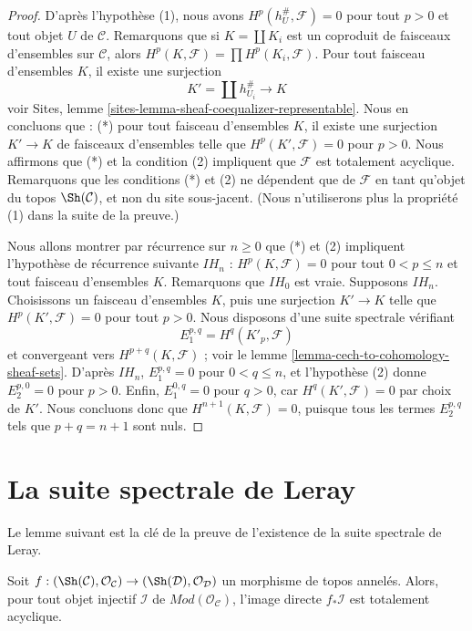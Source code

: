 \begin{proof}
D'après l'hypothèse (1), nous avons
$H^p(h_U^\#, \mathcal{F}) = 0$ pour tout $p > 0$ et tout objet $U$ de
$\mathcal{C}$. Remarquons que si $K = \coprod K_i$ est un coproduit de
faisceaux d'ensembles sur $\mathcal{C}$, alors
$H^p(K, \mathcal{F}) = \prod H^p(K_i, \mathcal{F})$.
Pour tout faisceau d'ensembles $K$, il existe une surjection
$$
K' = \coprod h_{U_i}^\# \longrightarrow K
$$
voir Sites, lemme \ref{sites-lemma-sheaf-coequalizer-representable}.
Nous en concluons que : (*) pour tout faisceau d'ensembles $K$, il existe une
surjection $K' \to K$ de faisceaux d'ensembles telle que
$H^p(K', \mathcal{F}) = 0$ pour $p > 0$. Nous affirmons que (*) et la
condition (2) impliquent que $\mathcal{F}$ est totalement acyclique.
Remarquons que les conditions (*) et (2) ne dépendent que de $\mathcal{F}$ en
tant qu'objet du topos $\Sh(\mathcal{C})$, et non du site sous-jacent.
(Nous n'utiliserons plus la propriété (1) dans la suite de la preuve.)

\medskip\noindent
Nous allons montrer par récurrence sur $n \geq 0$ que (*) et (2) impliquent
l'hypothèse de récurrence suivante $IH_n$ :
$H^p(K, \mathcal{F}) = 0$ pour tout $0 < p \leq n$ et tout faisceau
d'ensembles $K$. Remarquons que $IH_0$ est vraie. Supposons $IH_n$.
Choisissons un faisceau d'ensembles $K$, puis une surjection $K' \to K$ telle
que $H^p(K', \mathcal{F}) = 0$ pour tout $p > 0$. Nous disposons d'une suite
spectrale vérifiant
$$
E_1^{p, q} = H^q(K'_p, \mathcal{F})
$$
et convergeant vers $H^{p + q}(K, \mathcal{F})$ ; voir le
lemme \ref{lemma-cech-to-cohomology-sheaf-sets}.
D'après $IH_n$, $E_1^{p, q} = 0$ pour $0 < q \leq n$, et l'hypothèse (2)
donne $E_2^{p, 0} = 0$ pour $p > 0$. Enfin, $E_1^{0, q} = 0$ pour $q > 0$,
car $H^q(K', \mathcal{F}) = 0$ par choix de $K'$. Nous concluons donc que
$H^{n + 1}(K, \mathcal{F}) = 0$, puisque tous les termes $E_2^{p, q}$ tels
que $p + q = n + 1$ sont nuls.
\end{proof}







\section{La suite spectrale de Leray}
\label{section-leray}

\noindent
Le lemme suivant est la clé de la preuve de l'existence de la suite spectrale
de Leray.

\begin{lemma}
\label{lemma-direct-image-injective-sheaf}
Soit $f : (\Sh(\mathcal{C}), \mathcal{O}_\mathcal{C}) \to
(\Sh(\mathcal{D}), \mathcal{O}_\mathcal{D})$ un morphisme de topos annelés.
Alors, pour tout objet injectif $\mathcal{I}$ de
$\textit{Mod}(\mathcal{O}_\mathcal{C})$, l'image directe
$f_*\mathcal{I}$ est totalement acyclique.
\end{lemma}

